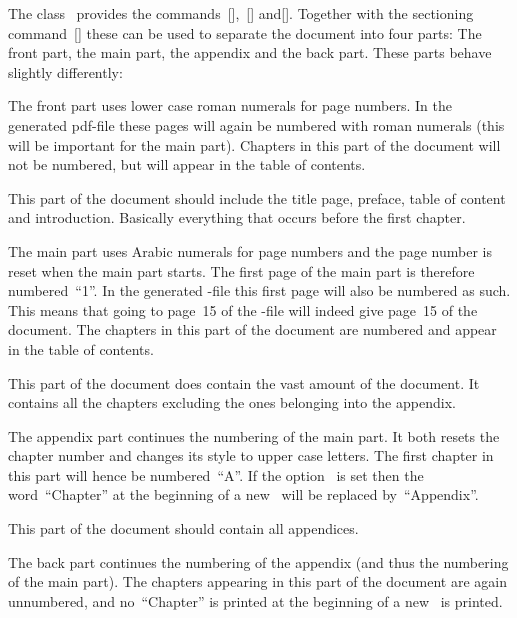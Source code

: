 The class~ provides the commands~[\comname],~[\comname] and[\comname].
Together with the sectioning command~[\comname] these can be used to separate the document into four parts:
The front part, the main part, the appendix and the back part.
These parts behave slightly differently:
\begin{myitemize}
  \item
    The front part uses lower case roman numerals for page numbers.
    In the generated \pagename{pdf}-file these pages will again be numbered with roman numerals (this will be important for the main part).
    Chapters in this part of the document will not be numbered, but will appear in the table of contents.
    
    This part of the document should include the title page, preface, table of content and introduction.
    Basically everything that occurs before the first chapter.
  \item
    The main part uses Arabic numerals for page numbers and the page number is reset when the main part starts.
    The first page of the main part is therefore numbered~\enquote{1}.
    In the generated -file this first page will also be numbered as such.
    This means that going to page~15 of the -file will indeed give page~15 of the document.
    The chapters in this part of the document are numbered and appear in the table of contents.
    
    This part of the document does contain the vast amount of the document.
    It contains all the chapters excluding the ones belonging into the appendix.
  \item
    The appendix part continues the numbering of the main part.
    It both resets the chapter number and changes its style to upper case letters.
    The first chapter in this part will hence be numbered~\enquote{A}.
    If the option~ is set then the word~\enquote{Chapter} at the beginning of a new~ will be replaced by~\enquote{Appendix}.
    
    This part of the document should contain all appendices.
  \item
    The back part continues the numbering of the appendix (and thus the numbering of the main part).
    The chapters appearing in this part of the document are again unnumbered, and no~\enquote{Chapter} is printed at the beginning of a new~ is printed.
    

\end{myitemize}
